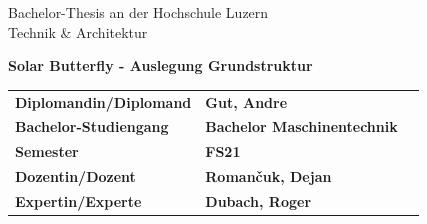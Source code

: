 \begin{titlepage}
    \begin{center}

        \LARGE
        Bachelor-Thesis an der Hochschule Luzern\\
        Technik \& Architektur

        \vspace{0.8cm}
        \Huge
        \textbf{Solar Butterfly - Auslegung Grundstruktur}

        \vspace{3cm}

        \begin{center}
        \end{center}

        \vfill
        \begin{table}[b]
        \small
          \begin{tabularx}{\linewidth}{llX}
            \textbf{Diplomandin/Diplomand} & \textbf{Gut, Andre}                                &\\[4 mm]
            \textbf{Bachelor-Studiengang}  & \textbf{Bachelor Maschinentechnik}                 &\\[4 mm]
            \textbf{Semester}              & \textbf{FS21}                                      &\\[4 mm]
            \textbf{Dozentin/Dozent}       & \textbf{Roman\v{c}uk, Dejan}                       &\\[4 mm]
            \textbf{Expertin/Experte}      & \textbf{Dubach, Roger}                             &
          \end{tabularx}
        \end{table}

    \end{center}
\end{titlepage}
